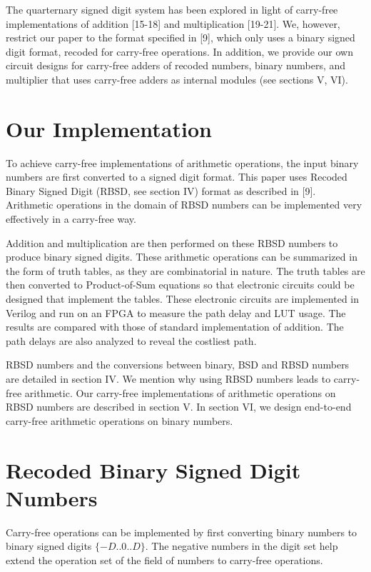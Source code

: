 \documentclass[conference]{IEEEtran}
\begin{document}
The quarternary signed digit system has been explored in light of carry-free implementations of addition [15-18] and multiplication [19-21]. We, however, restrict our paper to the format specified in [9], which only uses a binary signed digit format, recoded for carry-free operations. In addition, we provide our own circuit designs for carry-free adders of recoded numbers, binary numbers, and multiplier that uses carry-free adders as internal modules (see sections V, VI).


\section{Our Implementation}

To achieve carry-free implementations of arithmetic operations, the input binary numbers are first converted to a signed digit format. This paper uses Recoded Binary Signed Digit (RBSD, see section IV) format as described in [9]. Arithmetic operations in the domain of RBSD numbers can be implemented very effectively in a carry-free way.

Addition and multiplication are then performed on these RBSD numbers to produce binary signed digits. These arithmetic operations can be summarized in the form of truth tables, as they are combinatorial in nature. The truth tables are then converted to Product-of-Sum equations so that electronic circuits could be designed that implement the tables. These electronic circuits are implemented in Verilog and run on an FPGA to measure the path delay and LUT usage. The results are compared with those of standard implementation of addition. The path delays are also analyzed to reveal the costliest path.

RBSD numbers and the conversions between binary, BSD and RBSD numbers are detailed in section IV. We mention why using RBSD numbers leads to carry-free arithmetic. Our carry-free implementations of arithmetic operations on RBSD numbers are described in section V. In section VI, we design end-to-end carry-free arithmetic operations on binary numbers.


\section{Recoded Binary Signed Digit Numbers}

Carry-free operations can be implemented by first converting binary numbers to binary signed digits $\{-D..0..D\}$. The negative numbers in the digit set help extend the operation set of the field of numbers to carry-free operations.
\end{document}
